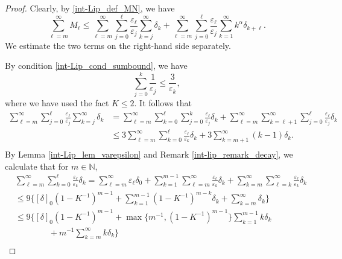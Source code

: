 \documentclass[reqno,12pt]{amsart} %
\theoremstyle{definition}
\theoremstyle{remark}
\numberwithin{equation}{section}
\newcommand{\e}{\varepsilon}
\begin{document}
\begin{proof}
    Clearly, by \eqref{int-Lip_def_MN}, we have
    \begin{equation}\label{eq.SMn}
        \sum_{\ell = m}^\infty M_\ell \le \sum_{\ell=m}^\infty \sum_{j=0}^{\ell}\frac{\varepsilon_\ell} {\varepsilon_j}\sum_{k=j}^\infty\delta_k + \sum_{\ell=m}^\infty\sum_{j=0}^\ell\frac{\varepsilon_\ell}{\varepsilon_j}\sum_{k=1}^\infty k^\alpha\delta_{k+\ell}.
    \end{equation}
    We estimate the two terms on the right-hand side separately.
    
    By condition \eqref{int-Lip_cond_sumbound}, we have
    \begin{equation*}
        \sum_{j=0}^k \frac{1}{\e_j} \le \frac{3}{\e_k},
    \end{equation*}
    where we have used the fact $K \le 2$.
    It follows that 
    \begin{equation}\label{est.SMm-1}
    \begin{aligned}
    \sum_{\ell=m}^\infty \sum_{j=0}^{\ell}\frac{\varepsilon_\ell} {\varepsilon_j}\sum_{k=j}^\infty\delta_k & = \sum_{\ell=m}^\infty\sum_{k=0}^{\ell}\sum_{j=0}^{k}\frac{\varepsilon_\ell}{\varepsilon_j}\delta_k+\sum_{\ell=m}^\infty\sum_{k=\ell+1}^{\infty}\sum_{j=0}^{\ell}\frac{\varepsilon_\ell}{\varepsilon_j}\delta_k\\
    & \leq 3\sum_{\ell=m}^\infty\sum_{k=0}^{\ell}\frac{\varepsilon_\ell}{\varepsilon_{k}}\delta_k+3\sum_{k=m+1}^\infty (k-1)\delta_k.\\
        \end{aligned}
    \end{equation}
    By Lemma \ref{int-Lip_lem_varepsilon} and Remark \ref{int-lip_remark_decay}, we calculate that for $m\in \mathbb{N}$,
    \begin{equation*}
        \begin{aligned}
        &\sum_{\ell=m}^\infty\sum_{k=0}^{\ell} \frac{\varepsilon_\ell}{\varepsilon_{k}}\delta_k = \sum_{\ell=m}^\infty\varepsilon_\ell\delta_0+\sum_{k=1}^{m-1}\sum_{\ell=m}^\infty\frac{\varepsilon_\ell}{\varepsilon_{k}}\delta_k+\sum_{k=m}^{\infty}\sum_{\ell=k}^\infty\frac{\varepsilon_\ell}{\varepsilon_{k}}\delta_k \\
        &\leq 9\bigg\{[\delta]_0(1-K^{-1})^{m-1}+\sum_{k=1}^{m-1}(1-K^{-1})^{m-k}\delta_k+\sum_{k=m}^{\infty}\delta_k\bigg\} \\&\leq 9 \bigg\{[\delta]_0(1-K^{-1})^{m-1}+\max\{m^{-1}, (1-K^{-1})^{m-1}\}\sum_{k=1}^{m-1}k\delta_k\\&\qquad\qquad+m^{-1}\sum_{k=m}^{\infty}k\delta_k\bigg\} \\

\end{aligned}
\end{equation*}
\end{proof}
\end{document}
